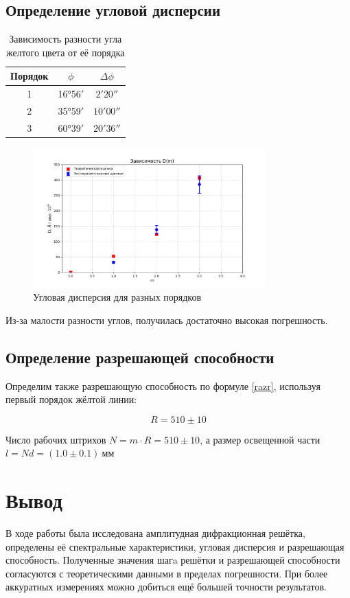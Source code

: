 \documentclass[a4paper]{article}
\begin{document}
\subsection{Определение угловой дисперсии}

\begin{table}[!h]
    \centering
    \begin{tabular}{|c|c|c|}
    \hline
    Порядок & $\phi$ & $\Delta \phi$ \\ \hline
    1       & 16°56$'$ & $ 2'20''$   \\ \hline
    2       & 35°59$'$ & $10'00''$   \\ \hline
    3       & 60°39$'$ & $20'36''$   \\ \hline
    \end{tabular}
    \caption{Зависимость разности угла желтого цвета от её порядка}
    \label{tab:angles}
\end{table}

\begin{figure}[!h]
    \centering
    \includegraphics[width=0.8\textwidth]{approx2.png}
    \caption{Угловая дисперсия для разных порядков}
\end{figure}

Из-за малости разности углов, получилась достаточно высокая погрешность.

\subsection{Определение разрешающей способности}

Определим также разрешающую способность по формуле \ref{razr},
используя первый порядок жёлтой линии:

\begin{equation}
    R = 510 \pm 10
\end{equation}

Число рабочих штрихов $N = m \cdot R = 510 \pm 10 $,
а размер освещенной части $l = Nd = (1.0 \pm 0.1) \ \text{мм}$

\section{Вывод}

В ходе работы была исследована амплитудная дифракционная решётка, определены её спектральные характеристики, угловая дисперсия и разрешающая способность. Полученные значения шагa решётки и разрешающей способности согласуются с теоретическими данными в пределах погрешности. При более аккуратных измерениях можно добиться ещё большей точности результатов.
\end{document}
